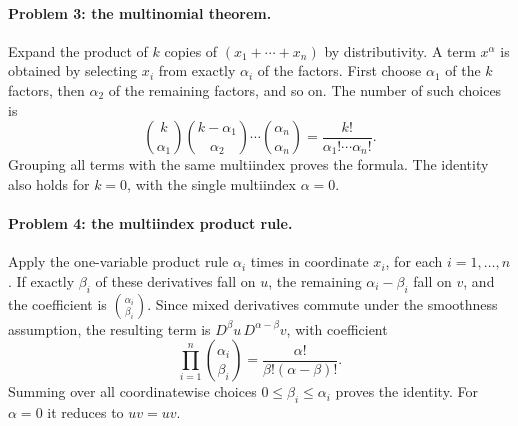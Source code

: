 \paragraph{Problem 3: the multinomial theorem.}
\begin{expandedproof}
Expand the product of $k$ copies of $(x_1+\cdots+x_n)$ by distributivity.
A term $x^\alpha$ is obtained by selecting $x_i$ from exactly $\alpha_i$
of the factors. First choose $\alpha_1$ of the $k$ factors, then
$\alpha_2$ of the remaining factors, and so on. The number of such choices is
\[
 \binom{k}{\alpha_1}\binom{k-\alpha_1}{\alpha_2}\cdots
 \binom{\alpha_n}{\alpha_n}=\frac{k!}{\alpha_1!\cdots\alpha_n!}.
\]
Grouping all terms with the same multiindex proves the formula. The
identity also holds for $k=0$, with the single multiindex $\alpha=0$.
\end{expandedproof}
\par\Needspace{65mm}

\paragraph{Problem 4: the multiindex product rule.}
\begin{expandedproof}
Apply the one-variable product rule $\alpha_i$ times in coordinate $x_i$,
for each $i=1,\ldots,n$. If exactly $\beta_i$ of these derivatives fall
on $u$, the remaining $\alpha_i-\beta_i$ fall on $v$, and the coefficient
is $\binom{\alpha_i}{\beta_i}$. Since mixed derivatives commute under the
smoothness assumption, the resulting term is
$D^\beta u\,D^{\alpha-\beta}v$, with coefficient
\[
 \prod_{i=1}^n\binom{\alpha_i}{\beta_i}
 =\frac{\alpha!}{\beta!(\alpha-\beta)!}.
\]
Summing over all coordinatewise choices $0\leq\beta_i\leq\alpha_i$
proves the identity. For $\alpha=0$ it reduces to $uv=uv$.
\end{expandedproof}

